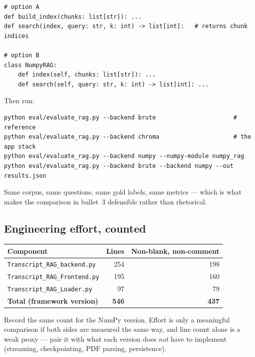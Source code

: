 \documentclass[11pt,a4paper]{article}
\begin{document}
\begin{lstlisting}
# option A
def build_index(chunks: list[str]): ...
def search(index, query: str, k: int) -> list[int]:   # returns chunk indices

# option B
class NumpyRAG:
    def index(self, chunks: list[str]): ...
    def search(self, query: str, k: int) -> list[int]: ...
\end{lstlisting}

\noindent Then run:

\begin{lstlisting}
python eval/evaluate_rag.py --backend brute                      # reference
python eval/evaluate_rag.py --backend chroma                     # the app stack
python eval/evaluate_rag.py --backend numpy --numpy-module numpy_rag
python eval/evaluate_rag.py --backend brute --backend numpy --out results.json
\end{lstlisting}

\noindent
Same corpus, same questions, same gold labels, same metrics --- which is what makes
the comparison in bullet~3 defensible rather than rhetorical.

\subsection{Engineering effort, counted}

\begin{center}
\begin{tabular}{@{}lrr@{}}
\toprule
\textbf{Component} & \textbf{Lines} & \textbf{Non-blank, non-comment} \\
\midrule
\texttt{Transcript\_RAG\_backend.py}  & 254 & 198 \\
\texttt{Transcript\_RAG\_Frontend.py} & 195 & 160 \\
\texttt{Transcript\_RAG\_Loader.py}   &  97 &  79 \\
\midrule
\textbf{Total (framework version)}    & \textbf{546} & \textbf{437} \\
\bottomrule
\end{tabular}
\end{center}

\noindent
Record the same count for the NumPy version. Effort is only a meaningful
comparison if both sides are measured the same way, and line count alone is a
weak proxy --- pair it with what each version does \emph{not} have to implement
(streaming, checkpointing, PDF parsing, persistence).

\end{document}
